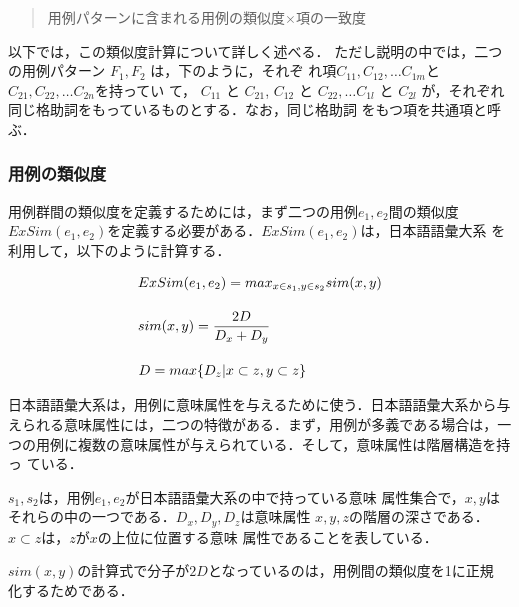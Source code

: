 \begin{quote}
 \vspace{10pt}
 用例パターンに含まれる用例の類似度$\times$項の一致度
 \vspace{10pt}
\end{quote}

以下では，この類似度計算について詳しく述べる．
ただし説明の中では，二つの用例パターン $F_1, F_2$ は，下のように，それぞ
れ項$C_{11},C_{12},\dots C_{1m}$と$C_{21},C_{22}, \dots C_{2n}$を持ってい
て， $C_{11}$ と $C_{21}$, $C_{12}$ と $C_{22}, \dots C_{1l}$ と
$C_{2l}$ が，それぞれ同じ格助詞をもっているものとする．なお，同じ格助詞
をもつ項を共通項と呼ぶ．

\begin{quote}
    \tr{\dots}{}{\dots}
 \tr{\dots}{}{\dots} 
\end{quote}


\subsubsection{用例の類似度}

用例群間の類似度を定義するためには，まず二つの用例$e_1,e_2$間の類似度
$ExSim(e_1,e_2)$を定義する必要がある．$ExSim(e_1,e_2)$は，日本語語彙大系
\cite{Ntt}を利用して，以下のように計算する．


\begin{eqnarray*}
 ExSim(e_1, e_2) = max_{x \in s_1, y \in s_2} sim(x,y) \\[10pt]
  sim(x,y) =  \frac{2D}{D_x + D_y}\hspace{2.8cm}\\[10pt]
  D = max \{ D_z | x \subset z, y \subset z \}\hspace{1.9cm}
\end{eqnarray*}

日本語語彙大系は，用例に意味属性を与えるために使う．日本語語彙大系から与
えられる意味属性には，二つの特徴がある．まず，用例が多義である場合は，一
つの用例に複数の意味属性が与えられている．そして，意味属性は階層構造を持っ
ている．

$s_1,s_2$は，用例$e_1,e_2$が日本語語彙大系\cite{Ntt}の中で持っている意味
属性集合で，$x,y$はそれらの中の一つである．$D_x,D_y,D_z$は意味属性
$x,y,z$の階層の深さである．$x \subset z$は，$z$が$x$の上位に位置する意味
属性であることを表している．

$sim(x,y)$の計算式で分子が$2D$となっているのは，用例間の類似度を1に正規
化するためである．



